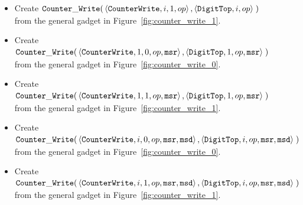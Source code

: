 \begin{itemize}
\begin{itemize}
        \item Create
        $\begin{aligned}[t]
            {\tt Counter\_Write}(& \left\langle {\tt CounterWrite}, i, 1, op \right\rangle,
                      \left\langle {\tt DigitTop},     i,    op \right\rangle \;)
        \end{aligned}$ \\ from the general gadget in Figure~\ref{fig:counter_write_1}.

        \item Create
        $\begin{aligned}[t]
            {\tt Counter\_Write}(& \left\langle {\tt CounterWrite}, 1, 0, op, {\tt msr} \right\rangle,
                      \left\langle {\tt DigitTop},     1,    op, {\tt msr} \right\rangle \;)
        \end{aligned}$ \\ from the general gadget in Figure~\ref{fig:counter_write_0}.

        \item Create
        $\begin{aligned}[t]
            {\tt Counter\_Write}(& \left\langle {\tt CounterWrite}, 1, 1, op, {\tt msr} \right\rangle,
                      \left\langle {\tt DigitTop},     1,    op, {\tt msr} \right\rangle \;)
        \end{aligned}$ \\ from the general gadget in Figure~\ref{fig:counter_write_1}.

        \item Create
        $\begin{aligned}[t]
            {\tt Counter\_Write}(& \left\langle {\tt CounterWrite}, i, 0, op, {\tt msr}, {\tt msd} \right\rangle,
                      \left\langle {\tt DigitTop},     i,    op, {\tt msr}, {\tt msd} \right\rangle \;)
        \end{aligned}$ \\ from the general gadget in Figure~\ref{fig:counter_write_0}.

        \item Create
        $\begin{aligned}[t]
            {\tt Counter\_Write}(& \left\langle {\tt CounterWrite}, i, 1, op, {\tt msr}, {\tt msd} \right\rangle,
                      \left\langle {\tt DigitTop},     i,    op, {\tt msr}, {\tt msd} \right\rangle \;)
        \end{aligned}$ \\ from the general gadget in Figure~\ref{fig:counter_write_1}.
    \end{itemize}


\end{itemize}
